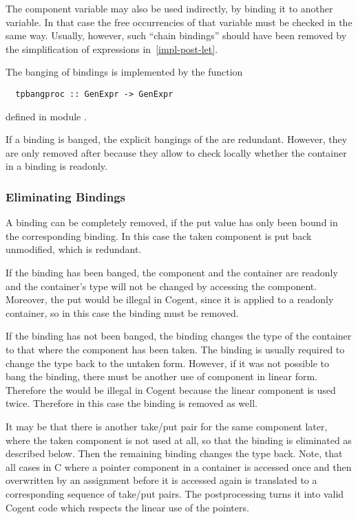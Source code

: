 The component variable  may also be used indirectly, by binding it to another variable. In that case the free 
occurrencies of that variable must be checked in the same way. Usually, however, such ``chain bindings'' should have been 
removed by the simplification of  expressions in~\ref{impl-post-let}.

The banging of  bindings is implemented by the function
\begin{verbatim}
  tpbangproc :: GenExpr -> GenExpr
\end{verbatim}
defined in module .

If a  binding is banged, the explicit bangings of the  are redundant. However, they are only removed after
 because they allow to check locally whether the container in a  binding is readonly.

\subsubsection{Eliminating  Bindings}

A  binding can be completely removed, if the put value  has only been bound in the corresponding 
binding. In this case the taken component is put back unmodified, which is redundant. 

If the  binding has been banged, the component and the container are readonly and the container's type will not be 
changed by accessing the component. Moreover, the put would be illegal in Cogent, since it is applied to a readonly container,
so in this case the  binding must be removed.

If the  binding has not been banged, the  binding changes the type of the container to that where the component
has been taken. The  binding is usually required to change the type back to the untaken form. However, if it was not possible
to bang the  binding, there must be another use of component  in linear form. Therefore the  would
be illegal in Cogent because the linear component is used twice. Therefore in this case the  binding is removed as well.

It may be that there is another take/put pair for the same component later, where the taken component is not used at all, so that 
the  binding is eliminated as described below. Then the remaining  binding changes the type back. Note, that
all cases in C where a pointer component in a container is accessed once and then overwritten by an assignment before it is 
accessed again is translated to a corresponding sequence of take/put pairs. The postprocessing turns it into valid Cogent code
which respects the linear use of the pointers.

